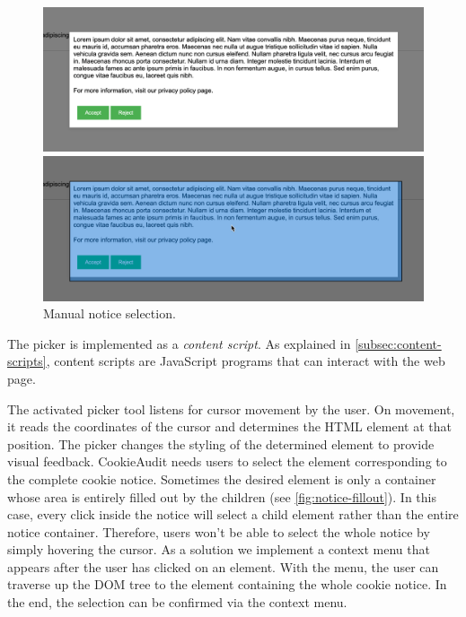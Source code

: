 \begin{figure}
	\centering
	\begin{minipage}{0.48\textwidth}
		\centering
		\includegraphics[width=1.0\linewidth]{media/screenshot_unselected.png}
	\end{minipage}\hfill
	\begin{minipage}{0.48\textwidth}
		\centering
		\includegraphics[width=1.0\linewidth]{media/screenshot_selected.png}      
	\end{minipage}
	\caption{Manual notice selection.}
	\label{fig:screenshot-selection}
\end{figure}

The picker is implemented as a \emph{content script}. 
As explained in \cref{subsec:content-scripts}, content scripts are JavaScript programs that can interact with the web page.

The activated picker tool listens for cursor movement by the user. 
On movement, it reads the coordinates of the cursor and determines the HTML element at that position.
The picker changes the styling of the determined element to provide visual feedback.
CookieAudit needs users to select the element corresponding to the complete cookie notice. 
Sometimes the desired element is only a container whose area is entirely filled out by the children (see \cref{fig:notice-fillout}).
In this case, every click inside the notice will select a child element rather than the entire notice container. 
Therefore, users won't be able to select the whole notice by simply hovering the cursor.
As a solution we implement a context menu that appears after the user has clicked on an element.
With the menu, the user can traverse up the DOM tree to the element containing the whole cookie notice.
In the end, the selection can be confirmed via the context menu.


